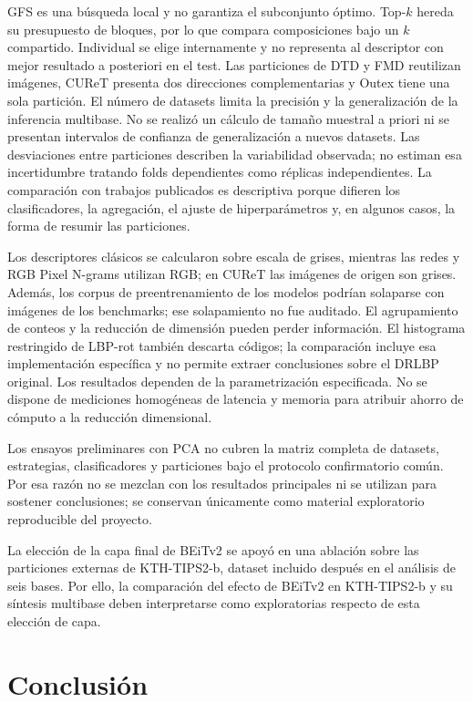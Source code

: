 \documentclass[a4paper,fleqn]{cas-sc}
\begin{document}
GFS es una búsqueda local y no garantiza el subconjunto óptimo. Top-$k$ hereda su presupuesto de bloques, por lo que compara composiciones bajo un $k$ compartido. Individual se elige internamente y no representa al descriptor con mejor resultado a posteriori en el test. Las particiones de DTD y FMD reutilizan imágenes, CUReT presenta dos direcciones complementarias y Outex tiene una sola partición. El número de datasets limita la precisión y la generalización de la inferencia multibase. No se realizó un cálculo de tamaño muestral a priori ni se presentan intervalos de confianza de generalización a nuevos datasets. Las desviaciones entre particiones describen la variabilidad observada; no estiman esa incertidumbre tratando folds dependientes como réplicas independientes. La comparación con trabajos publicados es descriptiva porque difieren los clasificadores, la agregación, el ajuste de hiperparámetros y, en algunos casos, la forma de resumir las particiones.

Los descriptores clásicos se calcularon sobre escala de grises, mientras las redes y RGB Pixel N-grams utilizan RGB; en CUReT las imágenes de origen son grises. Además, los corpus de preentrenamiento de los modelos podrían solaparse con imágenes de los benchmarks; ese solapamiento no fue auditado. El agrupamiento de conteos y la reducción de dimensión pueden perder información. El histograma restringido de LBP-rot también descarta códigos; la comparación incluye esa implementación específica y no permite extraer conclusiones sobre el DRLBP original. Los resultados dependen de la parametrización especificada. No se dispone de mediciones homogéneas de latencia y memoria para atribuir ahorro de cómputo a la reducción dimensional.

Los ensayos preliminares con PCA no cubren la matriz completa de datasets, estrategias, clasificadores y particiones bajo el protocolo confirmatorio común. Por esa razón no se mezclan con los resultados principales ni se utilizan para sostener conclusiones; se conservan únicamente como material exploratorio reproducible del proyecto.

La elección de la capa final de BEiTv2 se apoyó en una ablación sobre las particiones externas de KTH-TIPS2-b, dataset incluido después en el análisis de seis bases. Por ello, la comparación del efecto de BEiTv2 en KTH-TIPS2-b y su síntesis multibase deben interpretarse como exploratorias respecto de esta elección de capa.

\section{Conclusión}\label{sec:conclusion}
\end{document}
